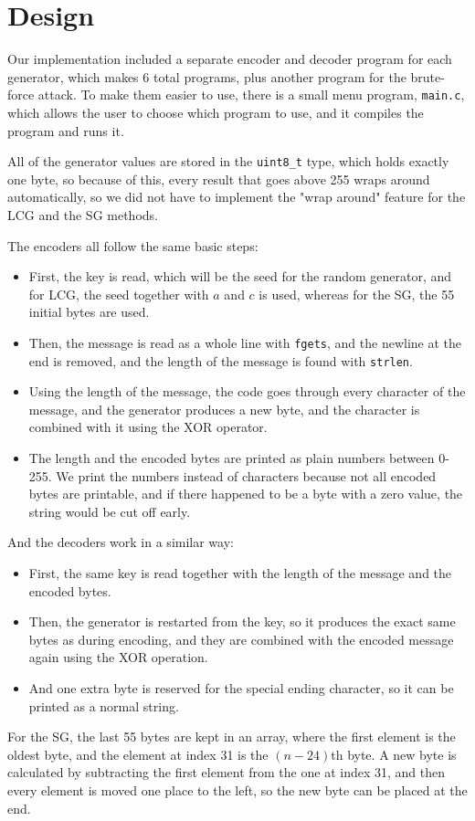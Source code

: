 \documentclass[a4paper,10pt]{article}
\begin{document}
\section{Design}
Our implementation included a separate encoder and decoder program for each generator, which makes 6 total programs, plus another program for the brute-force attack. To make them easier to use, there is a small menu program, \texttt{main.c}, which allows the user to choose which program to use, and it compiles the program and runs it. 

All of the generator values are stored in the \texttt{uint8\_t} type, which holds exactly one byte, so because of this, every result that goes above 255 wraps around automatically, so we did not have to implement the "wrap around" feature for the LCG and the SG methods.

The encoders all follow the same basic steps:
\begin{itemize}
\item First, the key is read, which will be the seed for the random generator, and for LCG, the seed together with $a$ and $c$ is used, whereas for the SG, the 55 initial bytes are used.
\item Then, the message is read as a whole line with \texttt{fgets}, and the newline at the end is removed, and the length of the message is found with \texttt{strlen}.
\item Using the length of the message, the code goes through every character of the message, and the generator produces a new byte, and the character is combined with it using the XOR operator.
\item The length and the encoded bytes are printed as plain numbers between 0-255. We print the numbers instead of characters because not all encoded bytes are printable, and if there happened to be a byte with a zero value, the string would be cut off early.
\end{itemize}
And the decoders work in a similar way:
\begin{itemize}
    \item First, the same key is read together with the length of the message and the encoded bytes.
    \item Then, the generator is restarted from the key, so it produces the exact same bytes as during encoding, and they are combined with the encoded message again using the XOR operation.
    \item And one extra byte is reserved for the special ending character, so it can be printed as a normal string.
\end{itemize}
For the SG, the last 55 bytes are kept in an array, where the first element is the oldest byte, and the element at index 31 is the $(n-24)$th byte. A new byte is calculated by subtracting the first element from the one at index 31, and then every element is moved one place to the left, so the new byte can be placed at the end.
\end{document}
